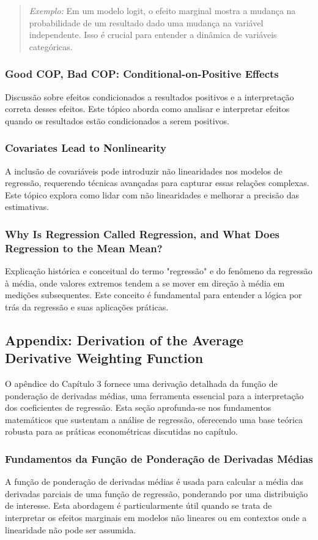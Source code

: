 \documentclass[a4paper,12pt]{article}[abntex2]
\begin{document}
\begin{quote}
\textit{Exemplo:} Em um modelo logit, o efeito marginal mostra a mudança na probabilidade de um resultado dado uma mudança na variável independente. Isso é crucial para entender a dinâmica de variáveis categóricas.
\end{quote}

\subsubsection{Good COP, Bad COP: Conditional-on-Positive Effects}
Discussão sobre efeitos condicionados a resultados positivos e a interpretação correta desses efeitos. Este tópico aborda como analisar e interpretar efeitos quando os resultados estão condicionados a serem positivos.

\subsubsection{Covariates Lead to Nonlinearity}
A inclusão de covariáveis pode introduzir não linearidades nos modelos de regressão, requerendo técnicas avançadas para capturar essas relações complexas. Este tópico explora como lidar com não linearidades e melhorar a precisão das estimativas.

\subsubsection{Why Is Regression Called Regression, and What Does Regression to the Mean Mean?}
Explicação histórica e conceitual do termo "regressão" e do fenômeno da regressão à média, onde valores extremos tendem a se mover em direção à média em medições subsequentes. Este conceito é fundamental para entender a lógica por trás da regressão e suas aplicações práticas.

\subsection{Appendix: Derivation of the Average Derivative Weighting Function}
O apêndice do Capítulo 3 fornece uma derivação detalhada da função de ponderação de derivadas médias, uma ferramenta essencial para a interpretação dos coeficientes de regressão. Esta seção aprofunda-se nos fundamentos matemáticos que sustentam a análise de regressão, oferecendo uma base teórica robusta para as práticas econométricas discutidas no capítulo.

\subsubsection{Fundamentos da Função de Ponderação de Derivadas Médias}
A função de ponderação de derivadas médias é usada para calcular a média das derivadas parciais de uma função de regressão, ponderando por uma distribuição de interesse. Esta abordagem é particularmente útil quando se trata de interpretar os efeitos marginais em modelos não lineares ou em contextos onde a linearidade não pode ser assumida.
\end{document}
